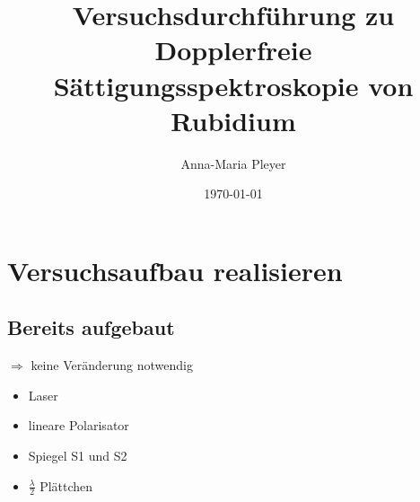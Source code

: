 \documentclass[a4paper, twoside]{article}
\begin{document}
\title{Versuchsdurchführung zu Dopplerfreie Sättigungsspektroskopie von Rubidium}
\author{Anna-Maria Pleyer}
\date{\today}
\maketitle
\section{Versuchsaufbau realisieren}
\subsection{Bereits aufgebaut} 
$\Rightarrow$ keine Veränderung notwendig
\begin{itemize}
    \item Laser
    \item lineare Polarisator
    \item Spiegel S1 und S2 
    \item $\frac{\lambda}{2}$ Plättchen
\end{itemize}
\end{document}
